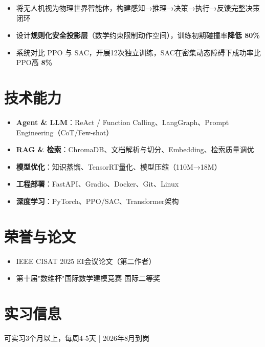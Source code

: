 \documentclass{resume}
\begin{document}
\begin{itemize}
  \item 将无人机视为物理世界智能体，构建感知→推理→决策→执行→反馈完整决策闭环
  \item 设计\textbf{规则化安全投影层}（数学约束限制动作空间），训练初期碰撞率\textbf{降低 80\%}
  \item 系统对比 PPO 与 SAC，开展12次独立训练，SAC在密集动态障碍下成功率比PPO高 \textbf{8\%}
\end{itemize}

\section{技术能力}
\begin{itemize}
  \item \textbf{Agent \& LLM}：ReAct / Function Calling、LangGraph、Prompt Engineering（CoT/Few-shot）
  \item \textbf{RAG \& 检索}：ChromaDB、文档解析与切分、Embedding、检索质量调优
  \item \textbf{模型优化}：知识蒸馏、TensorRT量化、模型压缩（110M→18M）
  \item \textbf{工程部署}：FastAPI、Gradio、Docker、Git、Linux
  \item \textbf{深度学习}：PyTorch、PPO/SAC、Transformer架构
\end{itemize}

\section{荣誉与论文}
\begin{itemize}
  \item IEEE CISAT 2025 EI会议论文（第二作者）
  \item 第十届"数维杯"国际数学建模竞赛 国际二等奖
\end{itemize}

\section{实习信息}
可实习3个月以上，每周4-5天 | 2026年8月到岗
\end{document}

